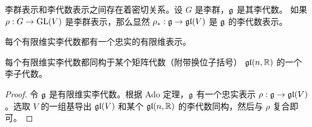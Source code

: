 李群表示和李代数表示之间存在着密切关系。设 $G$ 是李群，$\mathfrak{g}$ 是其李代数。
如果 $\rho:G\to \operatorname{GL}(V)$ 是李群表示，那么显然 $\rho_*:\mathfrak{g}\to\mathfrak{gl}(V)$
是 $\mathfrak{g}$ 的李代数表示。

\begin{theorem}[Ado]
  每个有限维实李代数都有一个忠实的有限维表示。
\end{theorem}

\begin{corollary}
  每个有限维实李代数都同构于某个矩阵代数（附带换位子括号）
  $\mathfrak{gl}(n,\mathbb{R})$ 的一个李子代数。
\end{corollary}
\begin{proof}
  令 $\mathfrak{g}$ 是有限维实李代数。根据 Ado 定理，$\mathfrak{g}$
  有一个忠实表示 $\rho:\mathfrak{g}\to\mathfrak{gl}(V)$。选取 $V$ 的一组基导出
  $\mathfrak{gl}(V)$ 和某个 $\mathfrak{gl}(n,\mathbb{R})$ 的李代数同构，然后与
  $\rho$ 复合即可。
\end{proof}

 